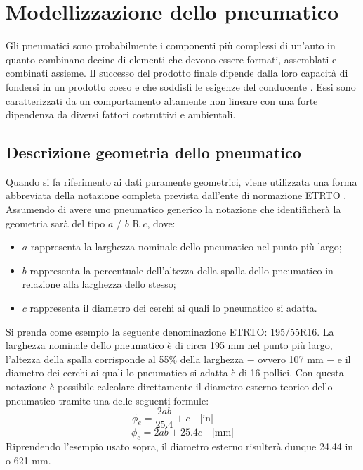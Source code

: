 \chapter{Modellizzazione dello pneumatico}
\label{Pneumatico}
%
Gli pneumatici sono probabilmente i componenti più complessi di un'auto in quanto combinano decine di elementi che devono essere formati, assemblati e combinati assieme. Il successo del prodotto finale dipende dalla loro capacità di fondersi in un prodotto coeso e che soddisfi le esigenze del conducente \cite{rill}. Essi sono caratterizzati da un comportamento altamente non lineare con una forte dipendenza da diversi fattori costruttivi e ambientali.
%
\section{Descrizione geometria dello pneumatico}
Quando si fa riferimento ai dati puramente geometrici, viene utilizzata una forma abbreviata della notazione completa prevista dall'ente di normazione \ac{ETRTO} \cite{etrto}. Assumendo di avere uno pneumatico generico la notazione che identificherà la geometria sarà del tipo $a$ / $b$ R $c$, dove:
\begin{itemize}
	\item $a$ rappresenta la larghezza nominale dello pneumatico nel punto più largo;
	\item $b$ rappresenta la percentuale dell'altezza della spalla dello pneumatico in relazione alla larghezza dello stesso;
	\item $c$ rappresenta il diametro dei cerchi ai quali lo pneumatico si adatta.
\end{itemize}
Si prenda come esempio la seguente denominazione \ac{ETRTO}: 195/55R16. La larghezza nominale dello pneumatico è di circa 195 mm nel punto più largo, l'altezza della spalla corrisponde al 55\% della larghezza $-$ ovvero 107 mm $-$ e il diametro dei cerchi ai quali lo pneumatico si adatta è di 16 pollici. Con questa notazione è possibile calcolare direttamente il diametro esterno teorico dello pneumatico tramite una delle seguenti formule:
%
\begin{equation}
\phi_e = \frac{2ab}{25.4}+c \quad \text{[in]} \qquad
\end{equation}
\begin{equation}
\phi_e = 2ab+25.4c \quad \text{[mm]}
\end{equation}
%
Riprendendo l'esempio usato sopra, il diametro esterno risulterà dunque 24.44 in o 621 mm.\\
